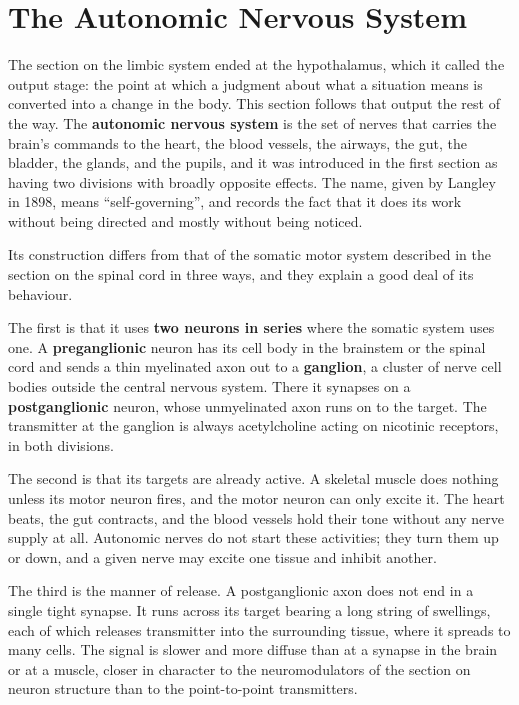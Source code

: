 \documentclass[11pt]{article}
\begin{document}
\section{The Autonomic Nervous System}

The section on the limbic system ended at the hypothalamus, which it called the output stage: the point at which a judgment about what a situation means is converted into a change in the body. This section follows that output the rest of the way. The \textbf{autonomic nervous system} is the set of nerves that carries the brain's commands to the heart, the blood vessels, the airways, the gut, the bladder, the glands, and the pupils, and it was introduced in the first section as having two divisions with broadly opposite effects. The name, given by Langley in 1898, means ``self-governing'', and records the fact that it does its work without being directed and mostly without being noticed.

Its construction differs from that of the somatic motor system described in the section on the spinal cord in three ways, and they explain a good deal of its behaviour.

The first is that it uses \textbf{two neurons in series} where the somatic system uses one. A \textbf{preganglionic} neuron has its cell body in the brainstem or the spinal cord and sends a thin myelinated axon out to a \textbf{ganglion}, a cluster of nerve cell bodies outside the central nervous system. There it synapses on a \textbf{postganglionic} neuron, whose unmyelinated axon runs on to the target. The transmitter at the ganglion is always acetylcholine acting on nicotinic receptors, in both divisions.

The second is that its targets are already active. A skeletal muscle does nothing unless its motor neuron fires, and the motor neuron can only excite it. The heart beats, the gut contracts, and the blood vessels hold their tone without any nerve supply at all. Autonomic nerves do not start these activities; they turn them up or down, and a given nerve may excite one tissue and inhibit another.

The third is the manner of release. A postganglionic axon does not end in a single tight synapse. It runs across its target bearing a long string of swellings, each of which releases transmitter into the surrounding tissue, where it spreads to many cells. The signal is slower and more diffuse than at a synapse in the brain or at a muscle, closer in character to the neuromodulators of the section on neuron structure than to the point-to-point transmitters.
\end{document}
